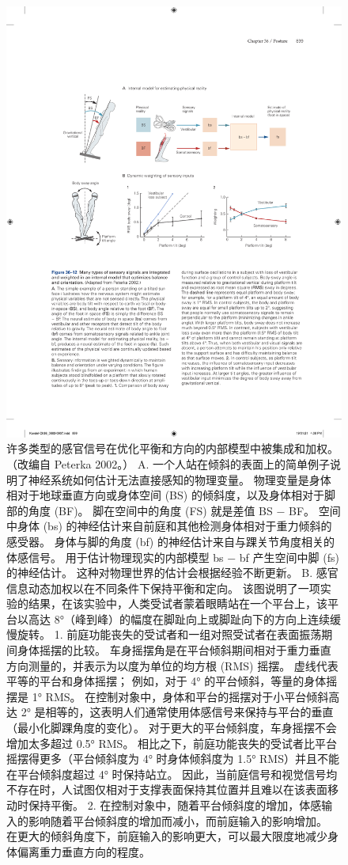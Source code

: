 \begin{figure}[htbp]
	\centering
	\includegraphics[width=0.85\linewidth]{chap36/fig_36_12}
	\caption{许多类型的感官信号在优化平衡和方向的内部模型中被集成和加权。 （改编自 Peterka 2002。） A. 一个人站在倾斜的表面上的简单例子说明了神经系统如何估计无法直接感知的物理变量。 物理变量是身体相对于地球垂直方向或身体空间 (BS) 的倾斜度，以及身体相对于脚部的角度 (BF)。 脚在空间中的角度 (FS) 就是差值 BS − BF。 空间中身体 (bs) 的神经估计来自前庭和其他检测身体相对于重力倾斜的感受器。 身体与脚的角度 (bf) 的神经估计来自与踝关节角度相关的体感信号。 用于估计物理现实的内部模型 bs − bf 产生空间中脚 (fs) 的神经估计。 这种对物理世界的估计会根据经验不断更新。 B. 感官信息动态加权以在不同条件下保持平衡和定向。 该图说明了一项实验的结果，在该实验中，人类受试者蒙着眼睛站在一个平台上，该平台以高达 8°（峰到峰）的幅度在脚趾向上或脚趾向下的方向上连续缓慢旋转。 1. 前庭功能丧失的受试者和一组对照受试者在表面振荡期间身体摇摆的比较。 车身摇摆角是在平台倾斜期间相对于重力垂直方向测量的，并表示为以度为单位的均方根 (RMS) 摇摆。 虚线代表平等的平台和身体摇摆； 例如，对于 4° 的平台倾斜，等量的身体摇摆是 1° RMS。 在控制对象中，身体和平台的摇摆对于小平台倾斜高达 2° 是相等的，这表明人们通常使用体感信号来保持与平台的垂直（最小化脚踝角度的变化）。 对于更大的平台倾斜度，车身摇摆不会增加太多超过 0.5° RMS。 相比之下，前庭功能丧失的受试者比平台摇摆得更多（平台倾斜度为 4° 时身体倾斜度为 1.5° RMS）并且不能在平台倾斜度超过 4° 时保持站立。 因此，当前庭信号和视觉信号均不存在时，人试图仅相对于支撑表面保持其位置并且难以在该表面移动时保持平衡。 2. 在控制对象中，随着平台倾斜度的增加，体感输入的影响随着平台倾斜度的增加而减小，而前庭输入的影响增加。 在更大的倾斜角度下，前庭输入的影响更大，可以最大限度地减少身体偏离重力垂直方向的程度。}
	\label{fig:36_12}
\end{figure}


